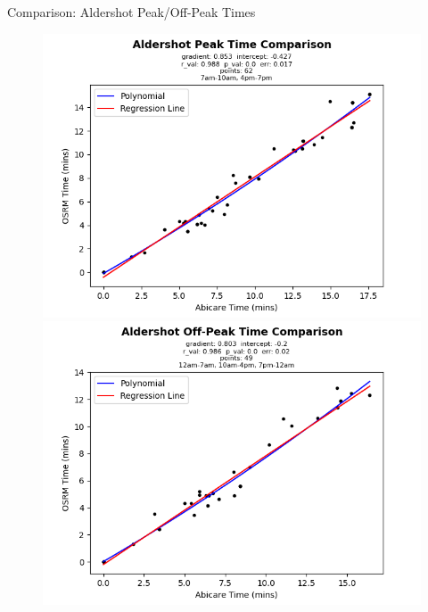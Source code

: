 \documentclass[usenames,dvipsnames]{beamer}
\begin{document}
\begin{frame}{Comparison: Aldershot Peak/Off-Peak Times}
	\begin{figure}
		\includegraphics[width=0.5\linewidth]{figures/Aldershot_peaktime_comparison_abi}%
		\includegraphics[width=0.5\linewidth]{figures/Aldershot_offpeaktime_comparison_abi}
	\end{figure}
\end{frame}
\end{document}
